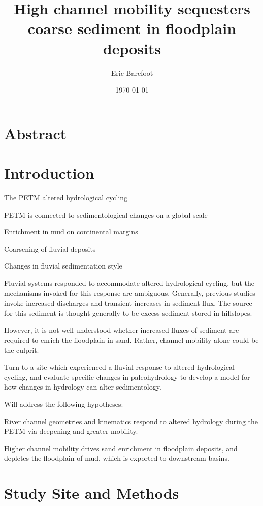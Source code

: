 \documentclass[draft]{compact_proposal}
\title{High channel mobility sequesters coarse sediment in floodplain deposits}
\author{Eric Barefoot}
\date{\today}
\begin{document}
\maketitle %

\section{Abstract}

\section{Introduction}

The PETM altered hydrological cycling

PETM is connected to sedimentological changes on a global scale

  Enrichment in mud on continental margins

  Coarsening of fluvial deposits

  Changes in fluvial sedimentation style

Fluvial systems responded to accommodate altered hydrological cycling, but the mechanisms invoked for this response are ambiguous.
Generally, previous studies invoke increased discharges and transient increases in sediment flux.
The source for this sediment is thought generally to be excess sediment stored in hillslopes.

However, it is not well understood whether increased fluxes of sediment are required to enrich the floodplain in sand.
Rather, channel mobility alone could be the culprit.

Turn to a site which experienced a fluvial response to altered hydrological cycling, and evaluate specific changes in paleohydrology to develop a model for how changes in hydrology can alter sedimentology.

Will address the following hypotheses:

  River channel geometries and kinematics respond to altered hydrology during the PETM via deepening and greater mobility.

  Higher channel mobility drives sand enrichment in floodplain deposits, and depletes the floodplain of mud, which is exported to downstream basins.

\section{Study Site and Methods}
\end{document}
